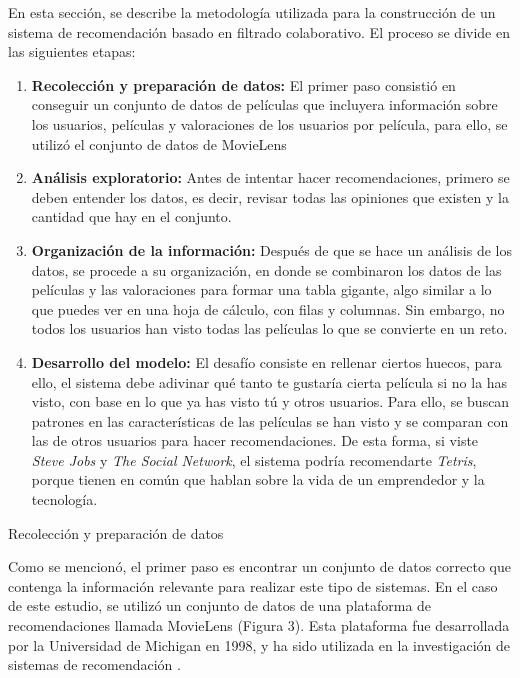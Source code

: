 \documentclass[letterpaper,10pt,final,hyphenatedtitles]{papertexKS}
\begin{document}
\begin{news}{2}
	En esta sección, se describe la metodología utilizada para la construcción de un sistema de recomendación basado en filtrado colaborativo. El proceso se divide en las siguientes etapas:
	\begin{enumerate}
		\item \textbf{Recolección y preparación de datos:} El primer paso consistió en conseguir un conjunto de datos de películas que incluyera información sobre los usuarios, películas y valoraciones de los usuarios por película, para ello, se utilizó el conjunto de datos de MovieLens
		\item \textbf{Análisis exploratorio:} Antes de intentar hacer recomendaciones, primero se deben entender los datos, es decir, revisar todas las opiniones que existen y la cantidad que hay en el conjunto.
		\item \textbf{Organización de la información:} Después de que se hace un análisis de los datos, se procede a su organización, en donde se combinaron los datos de las películas y las valoraciones para formar una tabla gigante, algo similar a lo que puedes ver en una hoja de cálculo, con filas y columnas. Sin embargo, no todos los usuarios han visto todas las películas lo que se convierte en un reto.
		\item \textbf{Desarrollo del modelo:} El desafío consiste en rellenar ciertos huecos, para ello, el sistema debe adivinar qué tanto te gustaría cierta película si no la has visto, con base en lo que ya has visto tú y otros usuarios. Para ello, se buscan patrones en las características de las películas se han visto y se comparan con las de otros usuarios para hacer recomendaciones. De esta forma, si viste \textit{Steve Jobs} y \textit{The Social Network}, el sistema podría recomendarte \textit{Tetris}, porque tienen en común que hablan sobre la vida de un emprendedor y la tecnología.
	\end{enumerate}

	\begin{center}
	\end{center}

	\noindent\textcolor{color}{\Large{Recolección y preparación de datos}}
    
	Como se mencionó, el primer paso es encontrar un conjunto de datos correcto que contenga la información relevante para realizar este tipo de sistemas. En el caso de este estudio, se utilizó un conjunto de datos de una plataforma de recomendaciones llamada MovieLens (Figura 3). Esta plataforma fue desarrollada por la Universidad de Michigan en 1998, y ha sido utilizada en la investigación de sistemas de recomendación \cite{10.1145/2827872}.


\end{news}
\end{document}
